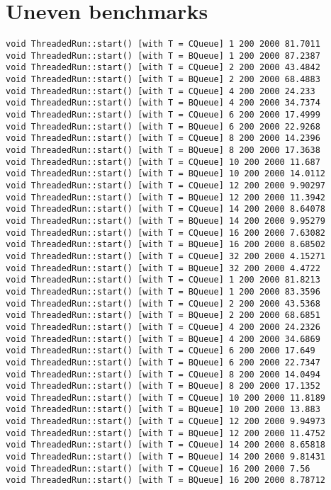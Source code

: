 \section{Uneven benchmarks}
\small
\begin{verbatim}
void ThreadedRun::start() [with T = CQueue] 1 200 2000 81.7011
void ThreadedRun::start() [with T = BQueue] 1 200 2000 87.2387
void ThreadedRun::start() [with T = CQueue] 2 200 2000 43.4842
void ThreadedRun::start() [with T = BQueue] 2 200 2000 68.4883
void ThreadedRun::start() [with T = CQueue] 4 200 2000 24.233
void ThreadedRun::start() [with T = BQueue] 4 200 2000 34.7374
void ThreadedRun::start() [with T = CQueue] 6 200 2000 17.4999
void ThreadedRun::start() [with T = BQueue] 6 200 2000 22.9268
void ThreadedRun::start() [with T = CQueue] 8 200 2000 14.2396
void ThreadedRun::start() [with T = BQueue] 8 200 2000 17.3638
void ThreadedRun::start() [with T = CQueue] 10 200 2000 11.687
void ThreadedRun::start() [with T = BQueue] 10 200 2000 14.0112
void ThreadedRun::start() [with T = CQueue] 12 200 2000 9.90297
void ThreadedRun::start() [with T = BQueue] 12 200 2000 11.3942
void ThreadedRun::start() [with T = CQueue] 14 200 2000 8.64078
void ThreadedRun::start() [with T = BQueue] 14 200 2000 9.95279
void ThreadedRun::start() [with T = CQueue] 16 200 2000 7.63082
void ThreadedRun::start() [with T = BQueue] 16 200 2000 8.68502
void ThreadedRun::start() [with T = CQueue] 32 200 2000 4.15271
void ThreadedRun::start() [with T = BQueue] 32 200 2000 4.4722
void ThreadedRun::start() [with T = CQueue] 1 200 2000 81.8213
void ThreadedRun::start() [with T = BQueue] 1 200 2000 83.3596
void ThreadedRun::start() [with T = CQueue] 2 200 2000 43.5368
void ThreadedRun::start() [with T = BQueue] 2 200 2000 68.6851
void ThreadedRun::start() [with T = CQueue] 4 200 2000 24.2326
void ThreadedRun::start() [with T = BQueue] 4 200 2000 34.6869
void ThreadedRun::start() [with T = CQueue] 6 200 2000 17.649
void ThreadedRun::start() [with T = BQueue] 6 200 2000 22.7347
void ThreadedRun::start() [with T = CQueue] 8 200 2000 14.0494
void ThreadedRun::start() [with T = BQueue] 8 200 2000 17.1352
void ThreadedRun::start() [with T = CQueue] 10 200 2000 11.8189
void ThreadedRun::start() [with T = BQueue] 10 200 2000 13.883
void ThreadedRun::start() [with T = CQueue] 12 200 2000 9.94973
void ThreadedRun::start() [with T = BQueue] 12 200 2000 11.4752
void ThreadedRun::start() [with T = CQueue] 14 200 2000 8.65818
void ThreadedRun::start() [with T = BQueue] 14 200 2000 9.81431
void ThreadedRun::start() [with T = CQueue] 16 200 2000 7.56
void ThreadedRun::start() [with T = BQueue] 16 200 2000 8.78712

\end{verbatim}

